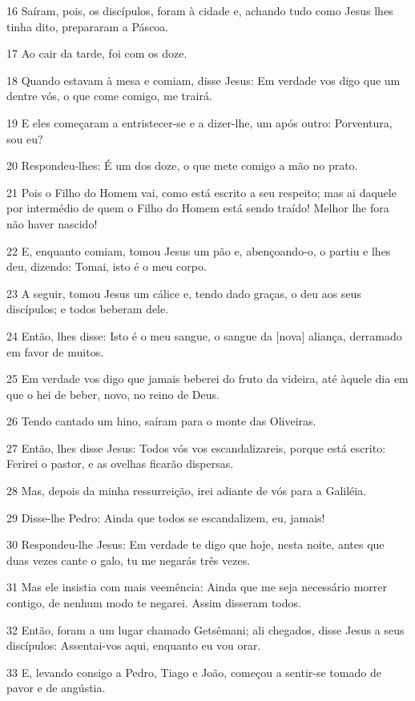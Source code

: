 \par 16 Saíram, pois, os discípulos, foram à cidade e, achando tudo como Jesus lhes tinha dito, prepararam a Páscoa.
\par 17 Ao cair da tarde, foi com os doze.
\par 18 Quando estavam à mesa e comiam, disse Jesus: Em verdade vos digo que um dentre vós, o que come comigo, me trairá.
\par 19 E eles começaram a entristecer-se e a dizer-lhe, um após outro: Porventura, sou eu?
\par 20 Respondeu-lhes: É um dos doze, o que mete comigo a mão no prato.
\par 21 Pois o Filho do Homem vai, como está escrito a seu respeito; mas ai daquele por intermédio de quem o Filho do Homem está sendo traído! Melhor lhe fora não haver nascido!
\par 22 E, enquanto comiam, tomou Jesus um pão e, abençoando-o, o partiu e lhes deu, dizendo: Tomai, isto é o meu corpo.
\par 23 A seguir, tomou Jesus um cálice e, tendo dado graças, o deu aos seus discípulos; e todos beberam dele.
\par 24 Então, lhes disse: Isto é o meu sangue, o sangue da [nova] aliança, derramado em favor de muitos.
\par 25 Em verdade vos digo que jamais beberei do fruto da videira, até àquele dia em que o hei de beber, novo, no reino de Deus.
\par 26 Tendo cantado um hino, saíram para o monte das Oliveiras.
\par 27 Então, lhes disse Jesus: Todos vós vos escandalizareis, porque está escrito: Ferirei o pastor, e as ovelhas ficarão dispersas.
\par 28 Mas, depois da minha ressurreição, irei adiante de vós para a Galiléia.
\par 29 Disse-lhe Pedro: Ainda que todos se escandalizem, eu, jamais!
\par 30 Respondeu-lhe Jesus: Em verdade te digo que hoje, nesta noite, antes que duas vezes cante o galo, tu me negarás três vezes.
\par 31 Mas ele insistia com mais veemência: Ainda que me seja necessário morrer contigo, de nenhum modo te negarei. Assim disseram todos.
\par 32 Então, foram a um lugar chamado Getsêmani; ali chegados, disse Jesus a seus discípulos: Assentai-vos aqui, enquanto eu vou orar.
\par 33 E, levando consigo a Pedro, Tiago e João, começou a sentir-se tomado de pavor e de angústia.
